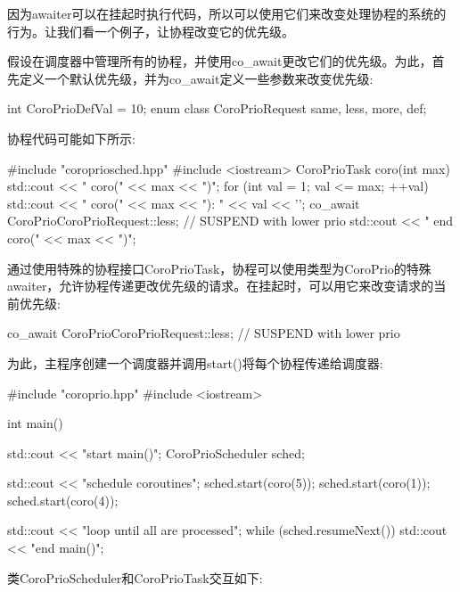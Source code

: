 
因为awaiter可以在挂起时执行代码，所以可以使用它们来改变处理协程的系统的行为。让我们看一个例子，让协程改变它的优先级。

假设在调度器中管理所有的协程，并使用co\_await更改它们的优先级。为此，首先定义一个默认优先级，并为co\_await定义一些参数来改变优先级:

\begin{cpp}
int CoroPrioDefVal = 10;
enum class CoroPrioRequest {same, less, more, def};
\end{cpp}

协程代码可能如下所示:


\begin{cpp}
#include "coropriosched.hpp"
#include <iostream>
CoroPrioTask coro(int max)
{
	std::cout << " coro(" << max << ")\n";
	for (int val = 1; val <= max; ++val) {
		std::cout << " coro(" << max << "): " << val << '\n';
		co_await CoroPrio{CoroPrioRequest::less}; // SUSPEND with lower prio
	}
	std::cout << " end coro(" << max << ")\n";
}
\end{cpp}

通过使用特殊的协程接口CoroPrioTask，协程可以使用类型为CoroPrio的特殊awaiter，允许协程传递更改优先级的请求。在挂起时，可以用它来改变请求的当前优先级:

\begin{cpp}
co_await CoroPrio{CoroPrioRequest::less}; // SUSPEND with lower prio
\end{cpp}

为此，主程序创建一个调度器并调用start()将每个协程传递给调度器:


\begin{cpp}
#include "coroprio.hpp"
#include <iostream>

int main()
{
	std::cout << "start main()\n";
	CoroPrioScheduler sched;
	
	std::cout << "schedule coroutines\n";
	sched.start(coro(5));
	sched.start(coro(1));
	sched.start(coro(4));
	
	std::cout << "loop until all are processed\n";
	while (sched.resumeNext()) {
	}
	std::cout << "end main()\n";
}
\end{cpp}

类CoroPrioScheduler和CoroPrioTask交互如下:

